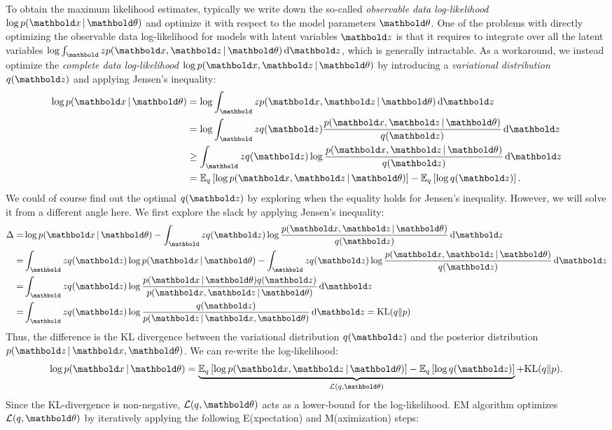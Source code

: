 To obtain the maximum likelihood estimates, typically we write down the so-called \textit{observable data log-likelihood} $\log p(\mbx \g \mb\theta)$ and optimize it with respect to the model parameters $\mb\theta$. One of the problems with directly optimizing the observable data log-likelihood for models with latent variables $\mbz$ is that it requires to integrate over all the latent variables $\log \int_\mbz p(\mbx, \mbz \g \mb\theta) \dif\mbz$, which is generally intractable. As a workaround, we instead optimize the \textit{complete data log-likelihood} $\log p(\mbx, \mbz \g \mb \theta)$ by introducing a \textit{variational distribution} $q(\mbz)$ and applying Jensen's inequality:
\begin{equation}
\begin{split}
\log p(\mbx \g \mb\theta) &= \log\int_\mbz p(\mbx, \mbz \g \mb\theta) \dif{\mbz}\\
&= \log\int_\mbz q(\mbz) \frac{p(\mbx, \mbz \g \mb\theta)}{q(\mbz)} \dif{\mbz}\\
&\geq \int_\mbz q(\mbz) \log\frac{p(\mbx, \mbz \g \mb\theta)}{q(\mbz)} \dif\mbz\\
&= \EE{q}{\log p(\mbx, \mbz \g \mb\theta)} - \EE{q}{\log q(\mbz)}.
\end{split}
\label{chpt:background:eq:em}
\end{equation}
We could of course find out the optimal $q(\mbz)$ by exploring when the equality holds for Jensen's inequality. However, we will solve it from a different angle here. We first explore the slack by applying Jensen's inequality:
\begin{align*}
\Delta =& \log p(\mbx \g \mb\theta) - \int_\mbz q(\mbz) \log\frac{p(\mbx, \mbz \g \mb\theta)}{q(\mbz)} \dif\mbz \\
=& \int_\mbz q(\mbz)\log p(\mbx \g \mb\theta) - \int_\mbz q(\mbz) \log\frac{p(\mbx, \mbz \g \mb\theta)}{q(\mbz)} \dif\mbz\\
=& \int_\mbz q(\mbz) \log\frac{p(\mbx \g \mb\theta) q(\mbz)} {p(\mbx, \mbz \g \mb\theta)}\dif\mbz\\
=& \int_\mbz q(\mbz) \log\frac{ q(\mbz)} {p(\mbz \g \mbx, \mb\theta)}\dif\mbz = \textrm{KL}(q\|p)
\end{align*}
Thus, the difference is the \gls{KL} divergence between the variational distribution $q(\mbz)$ and the posterior distribution $p(\mbz \g \mbx, \mb\theta)$. We can re-write the log-likelihood:
\[
\log p(\mbx \g \mb\theta) = \underbrace{\EE{q}{\log p(\mbx, \mbz \g \mb\theta)} - \EE{q}{\log q(\mbz)}}_{\cL(q, \mb\theta)} + \textrm{KL}(q\|p).
\]
Since the \gls{KL}-divergence is non-negative, $\cL(q, \mb\theta)$ acts as a lower-bound for the log-likelihood. \gls{EM} algorithm optimizes $\cL(q, \mb\theta)$ by iteratively applying the following E(xpectation) and M(aximization) steps:

